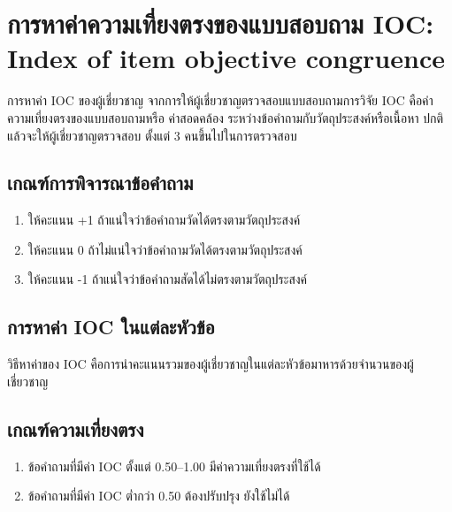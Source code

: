 \renewcommand\thechoice{\Alph{choice}}
\newcommand\choicelabel{\thechoice.}

\newenvironment{choices}%
  {\list{\choicelabel}%
     {\usecounter{choice}\def\makelabel##1{\hss\llap{##1}}%
       \settowidth{\leftmargin}{W.\hskip\labelsep\hskip 2.5em}%
       \def\choice{%
         \item
       } %
       \labelwidth\leftmargin\advance\labelwidth-\labelsep
       \topsep=0pt
       \partopsep=0pt
     }%
  }%
  {\endlist}

\chapter{การหาค่าความเที่ยงตรงของแบบสอบถาม IOC: Index of item objective congruence} \label{app1}

การหาค่า IOC ของผู้เชี่ยวชาญ จากการให้ผู้เชี่ยวชาญตรวจสอบแบบสอบถามการวิจัย IOC คือค่าความเที่ยงตรงของแบบสอบถามหรือ ค่าสอดคล้อง
ระหว่างข้อคำถามกับวัตถุประสงค์หรือเนื้อหา ปกติแล้วจะให้ผู้เชี่ยวชาญตรวจสอบ ตั้งแต่ 3 คนขึ้นไปในการตรวจสอบ

\section{เกณฑ์การพิจารณาข้อคำถาม}
\begin{enumerate}
    \item ให้คะแนน +1 ถ้าแน่ใจว่าข้อคำถามวัดได้ตรงตามวัตถุประสงค์
    \item ให้คะแนน 0 ถ้าไม่แน่ใจว่าข้อคำถามวัดได้ตรงตามวัตถุประสงค์
    \item ให้คะแนน -1 ถ้าแน่ใจว่าข้อคำถามสัดได้ไม่ตรงตามวัตถุประสงค์
\end{enumerate}

\section{การหาค่า IOC ในแต่ละหัวข้อ}
วิธีหาค่าของ IOC คือการนำคะแนนรวมของผู้เชี่ยวชาญในแต่ละหัวข้อมาหารด้วยจำนวนของผู้เชี่ยวชาญ

\section{เกณฑ์ความเที่ยงตรง}
\begin{enumerate}
    \item ข้อคำถามที่มีค่า IOC ตั้งแต่ 0.50--1.00 มีค่าความเที่ยงตรงที่ใช้ได้
    \item ข้อคำถามที่มีค่า IOC ต่ำกว่า 0.50 ต้องปรับปรุง ยังใช้ไม่ได้
\end{enumerate}

